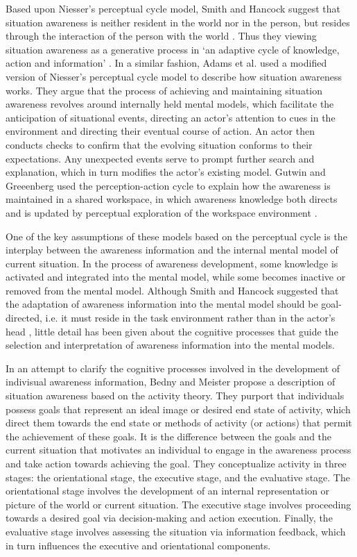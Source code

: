 Based upon Niesser’s perceptual cycle model, Smith and Hancock suggest that situation awareness is neither resident in the world nor in the person, but resides through the interaction of the person with the world \cite{Smith1995}. Thus they viewing situation awareness as a generative process in `an adaptive cycle of knowledge, action and information' \cite{Smith1995}. In a similar fashion, Adams et al. \cite{Adams1995} used a modified version of Niesser’s perceptual cycle model to describe how situation awareness works. They argue that the process of achieving and maintaining situation awareness revolves around internally held mental models, which facilitate the anticipation of situational events, directing an actor's attention to cues in the environment and directing their eventual course of action. An actor then conducts checks to confirm that the evolving situation conforms to their expectations. Any unexpected events serve to prompt further search and explanation, which in turn modifies the actor's existing model. Gutwin and Greeenberg used the perception-action cycle to explain how the awareness is maintained in a shared workspace, in which awareness knowledge both directs and is updated by perceptual exploration of the workspace environment \cite{Gutwin2002}.

One of the key assumptions of these models based on the perceptual cycle is the interplay between the awareness information and the internal mental model of current situation. In the process of awareness development, some knowledge is activated and integrated into the mental model, while some becomes inactive or removed from the mental model. Although Smith and Hancock suggested that the adaptation of awareness information into the mental model should be goal-directed, i.e. it must reside in the task environment rather than in the actor's head \cite{Smith1995}, little detail has been given about the cognitive processes that guide the selection and interpretation of awareness information into the mental models.

In an attempt to clarify the cognitive processes involved in the development of indivisual awareness information, Bedny and Meister \cite{Bedny1999} propose a description of situation awareness based on the activity theory. They purport that individuals possess goals that represent an ideal image or desired end state of activity, which direct them towards the end state or methods of activity (or actions) that permit the achievement of these goals. It is the difference between the goals and the current situation that motivates an individual to engage in the awareness process and take action towards achieving the goal. They conceptualize activity in three stages: the orientational stage, the executive stage, and the evaluative stage. The orientational stage involves the development of an internal representation or picture of the world or current situation. The executive stage involves proceeding towards a desired goal via decision-making and action execution. Finally, the evaluative stage involves assessing the situation via information feedback, which in turn influences the executive and orientational components.

